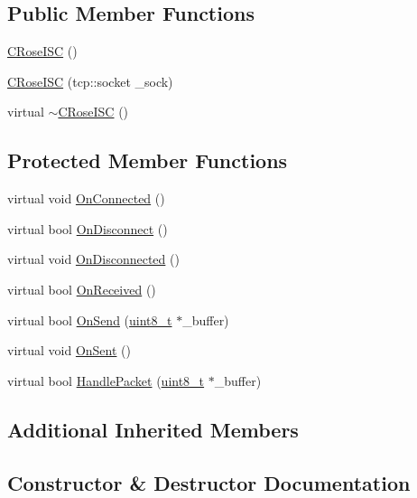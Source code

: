 \subsection*{Public Member Functions}
\begin{DoxyCompactItemize}
\item 
\hyperlink{classCRoseISC_abe9e787025541c0ca996ff9ce8d0e8dd}{C\+Rose\+I\+SC} ()
\item 
\hyperlink{classCRoseISC_a60f233074af16d42996db4576c8ba52b}{C\+Rose\+I\+SC} (tcp\+::socket \+\_\+sock)
\item 
virtual \hyperlink{classCRoseISC_aeb35b944ca0881209c8eef2af81f3cc5}{$\sim$\+C\+Rose\+I\+SC} ()
\end{DoxyCompactItemize}
\subsection*{Protected Member Functions}
\begin{DoxyCompactItemize}
\item 
virtual void \hyperlink{classCRoseISC_a81103ca6aff03e08c5dc15faa666b6ef}{On\+Connected} ()
\item 
virtual bool \hyperlink{classCRoseISC_a0aedc4da227fda95634988d71bf61033}{On\+Disconnect} ()
\item 
virtual void \hyperlink{classCRoseISC_a1fd6d96a47de1042670a20957a8916d8}{On\+Disconnected} ()
\item 
virtual bool \hyperlink{classCRoseISC_a556a6577a72ee036955df48fb89395cd}{On\+Received} ()
\item 
virtual bool \hyperlink{classCRoseISC_a95d93a42933566edfa0c29f33aa19c97}{On\+Send} (\hyperlink{stdint_8h_aba7bc1797add20fe3efdf37ced1182c5}{uint8\+\_\+t} $\ast$\+\_\+buffer)
\item 
virtual void \hyperlink{classCRoseISC_adfbcc83f4dcf0f7bbe2c6f8b3980f5f1}{On\+Sent} ()
\item 
virtual bool \hyperlink{classCRoseISC_ab56709ba16b2cf652f461c7cd9e8dd3d}{Handle\+Packet} (\hyperlink{stdint_8h_aba7bc1797add20fe3efdf37ced1182c5}{uint8\+\_\+t} $\ast$\+\_\+buffer)
\end{DoxyCompactItemize}
\subsection*{Additional Inherited Members}


\subsection{Constructor \& Destructor Documentation}
